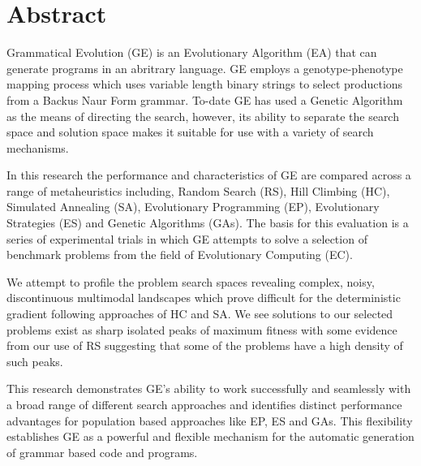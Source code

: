 \thispagestyle{plain}
\section*{Abstract}
Grammatical Evolution (GE) is an Evolutionary Algorithm (EA) that can generate programs in an abritrary language. GE employs a genotype-phenotype mapping process which uses variable length binary strings to select productions from a Backus Naur Form grammar. To-date GE has used a Genetic Algorithm as the means of directing the search, however, its ability to separate the search space and solution space makes it suitable for use with a variety of search mechanisms.

In this research the performance and characteristics of GE are compared across a range of metaheuristics including, Random Search (RS), Hill Climbing (HC), Simulated Annealing (SA), Evolutionary Programming (EP), Evolutionary Strategies (ES) and Genetic Algorithms (GAs). The basis for this evaluation is a series of experimental trials in which GE attempts to solve a selection of benchmark problems from the field of Evolutionary Computing (EC).

We attempt to profile the problem search spaces revealing complex, noisy, discontinuous multimodal landscapes which prove difficult for the deterministic gradient following approaches of HC and SA. We see solutions to our selected problems exist as sharp isolated peaks of maximum fitness with some evidence from our use of RS suggesting that some of the problems have a high density of such peaks.

This research demonstrates GE's ability to work successfully and seamlessly with a broad range of different search approaches and identifies  distinct performance advantages for population based approaches like EP, ES and GAs. This flexibility establishes GE as a powerful and flexible mechanism for the automatic generation of grammar based code and programs. 









